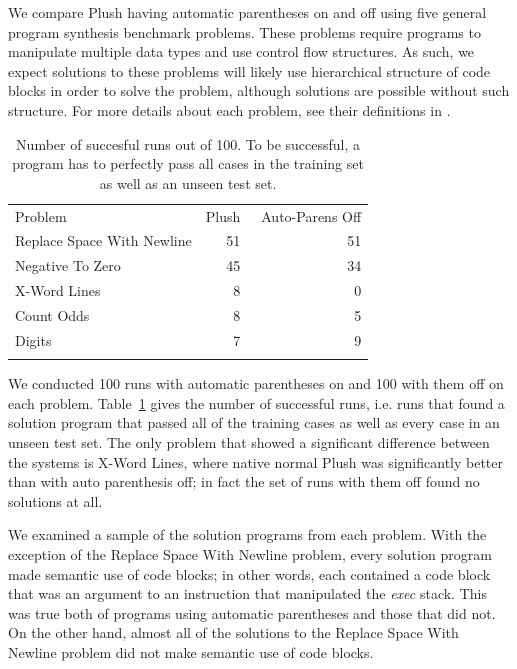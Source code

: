 \documentclass[graybox]{svmult}
\begin{document}
We compare Plush having automatic parentheses on and off using five general program synthesis benchmark problems. These problems require programs to manipulate multiple data types and use control flow structures. As such, we expect solutions to these problems will likely use hierarchical structure of code blocks in order to solve the problem, although solutions are possible without such structure. For more details about each problem, see their definitions in \cite{Helmuth:2015:GECCO}.

\begin{table}[t]
\centering
\caption{
Number of succesful runs out of 100. To be successful, a program has to perfectly pass all cases in the training set as well as an unseen test set.
}
\label{no-auto-parens-experiment}       %
%
%
\begin{tabular}{l r r}
\hline\noalign{\smallskip}
Problem                    & Plush & ~Auto-Parens Off \\
\noalign{\smallskip}\svhline\noalign{\smallskip}
Replace Space With Newline &  51 & 51 \\
Negative To Zero           &  45 & 34 \\
X-Word Lines               &   8 &  0 \\
Count Odds                 &   8 &  5 \\
Digits                     &   7 &  9 \\
\noalign{\smallskip}\hline\noalign{\smallskip}
\end{tabular}
\end{table}

We conducted 100 runs with automatic parentheses on and 100 with them off on each problem. Table~\ref{no-auto-parens-experiment} gives the number of successful runs, i.e. runs that found a solution program that passed all of the training cases as well as every case in an unseen test set. The only problem that showed a significant difference between the systems is X-Word Lines, where native normal Plush was significantly better than with auto parenthesis off; in fact the set of runs with them off found no solutions at all.

We examined a sample of the solution programs from each problem. With the exception of the Replace Space With Newline problem, every solution program made semantic use of code blocks; in other words, each contained a code block that was an argument to an instruction that manipulated the \textit{exec} stack. This was true both of programs using automatic parentheses and those that did not. On the other hand, almost all of the solutions to the Replace Space With Newline problem did not make semantic use of code blocks.
\end{document}
